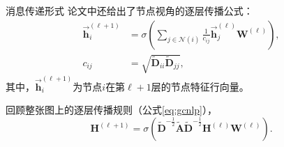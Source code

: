 \documentclass{beamer}
\begin{document}
\begin{frame}{消息传递形式}
	论文\cite{kipf2017gcn}中还给出了节点视角的逐层传播公式：
	\begin{equation}
		\label{eq:gcnmicro}
		\begin{aligned}
			\vec{\textbf{h}}_i^{\left(\ell+1\right)}&=\sigma\left(\sum\limits_{j\in\mathcal{N}\left(i\right)}\frac{1}{c_{ij}}\vec{\textbf{h}}_j^{\left(\ell\right)}\textbf{W}^{\left(\ell\right)}\right), \\
			c_{ij}&=\sqrt{\tilde{\textbf{D}}_{ii}\tilde{\textbf{D}}_{jj}},
		\end{aligned}
	\end{equation}
	其中，$\vec{\textbf{h}}_i^{\left(\ell+1\right)}$为节点$i$在第$\ell+1$层的节点特征行向量。
	
	回顾整张图上的逐层传播规则（公式\ref{eq:gcnlp}），
	\begin{equation*}
		\textbf{H}^{\left(\ell+1\right)}=\sigma\left(\tilde{\textbf{D}}^{-\frac{1}{2}}\tilde{\textbf{A}}\tilde{\textbf{D}}^{-\frac{1}{2}}\textbf{H}^{\left(\ell\right)}\textbf{W}^{\left(\ell\right)}\right).
	\end{equation*}
\end{frame}
\end{document}
